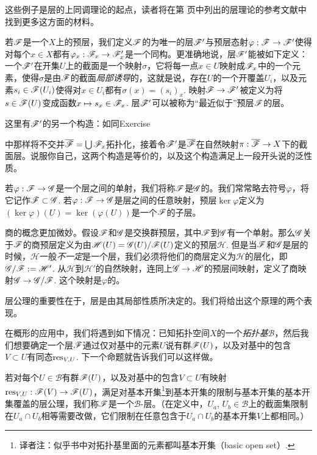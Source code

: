 这些例子是层的上同调理论的起点，读者将在第 \pageref{ref:1} 页中列出的层理论的参考文献中找到更多这方面的材料。

若$\mathscr{F}$是一个$X$上的预层，我们定义$\mathscr{F}$的为唯一的层$\mathscr{F}'$与预层态射$\varphi:\mathscr{F}\to\mathscr{F}'$使得对每个$x\in X$都有$\varphi_x:\mathscr{F}_x\to\mathscr{F}'_x$是一个同构。更准确地说，层$\mathscr{F}'$能被如下定义：一个$\mathscr{F}'$在开集$U$上的截面是一个映射$\sigma$，它将每一点$x\in U$映射成$\mathscr{F}_x$中的一个元素，使得$\sigma$是由$\mathscr{F}$的截面\textit{局部诱导}的，这就是说，存在$U$的一个开覆盖$U_i$，以及元素$s_i\in \mathscr{F}(U_i)$使得对$x\in U_i$都有$\sigma(x)=(s_i)_x$. 映射$\mathscr{F}\to\mathscr{F}'$被定义为将$s\in\mathscr{F}(U)$变成函数$x\mapsto s_x\in\mathscr{F}_x$. 层$\mathscr{F}'$可以被称为“最近似于”预层$\mathscr{F}$的层。

\begin{exe}
	这里有$\mathscr{F}'$的另一个构造：如同Exercise {{\addtocounter{thm}{-3}}\thethm{\addtocounter{thm}{3}}} 中那样将不交并$\overline{\mathscr{F}}=\bigcup \mathscr{F}_x$拓扑化，接着令$\mathscr{F}'$是$\overline{\mathscr{F}}$在自然映射$\pi:\overline{\mathscr{F}}\to X$下的截面层。说服你自己，这两个构造是等价的，以及这个构造满足上一段开头说的泛性质。
\end{exe}

若$\varphi:\mathscr{F}\to\mathscr{G}$是一个层之间的单射，我们将称$\mathscr{F}$是$\mathscr{G}$的。我们常常略去符号$\varphi$，将它记作$\mathscr{F}\subset \mathscr{G}$. 若$\varphi:\mathscr{F}\to\mathscr{G}$是层之间的任意映射，预层$\ker\varphi$定义为$(\ker\varphi)(U)=\ker(\varphi(U))$是一个$\mathscr{F}$的子层。

商的概念更加微妙。假设$\mathscr{F}$和$\mathscr{G}$是交换群预层，其中$\mathscr{F}$到$\mathscr{G}$有一个单射。那么$\mathscr{G}$关于$\mathscr{F}$的商预层定义为由$\mathscr{H}(U)=\mathscr{G}(U)/\mathscr{F}(U)$定义的预层$\mathscr{H}$. 但是当$\mathscr{F}$和$\mathscr{G}$是层的时候，$\mathscr{H}$一般\textit{不一定}是一个层，我们必须将他们的商层定义为$\mathscr{H}$的层化，即$\mathscr{G}/\mathscr{F}:=\mathscr{H}'$. 从$\mathscr{H}$到$\mathscr{H}'$的自然映射，连同上$\mathscr{G}\to \mathscr{H}$的预层间映射，定义了商映射$\mathscr{G}\to \mathscr{G}/\mathscr{F}$. 这个映射是$\varphi$的。

层公理的重要性在于，层是由其局部性质所决定的。我们将给出这个原理的两个表现。

在概形的应用中，我们将遇到如下情况：已知拓扑空间$X$的一个\textit{拓扑基}$\mathscr{B}$，然后我们想要确定一个层$\mathscr{F}$通过仅对基中的元素$U$说有群$\mathscr{F}(U)$，以及对基中的包含$V\subset U$有同态$\operatorname{res}_{V,U}$. 下一个命题就告诉我们可以这样做。

若对每个$U\in\mathscr{B}$有群$\mathscr{F}(U)$，以及对基中的包含$V\subset U$有映射$\operatorname{res}_{V,U}:\mathscr{F}(V)\to \mathscr{F}(U)$，满足对基本开集\footnote{译者注：似乎书中对拓扑基里面的元素都叫基本开集（basic open set）.}到基本开集的限制与基本开集的基本开集覆盖的层公理，我们称$\mathscr{F}$是一个$\mathscr{B}$\hyp 层。（在定义中，$U_a$, $U_b\in\mathscr{B}$上的截面集限制在$U_a\cap U_b$相等需要改做，它们限制在任意包含于$U_a\cap U_b$的基本开集$V$上都相同。）

